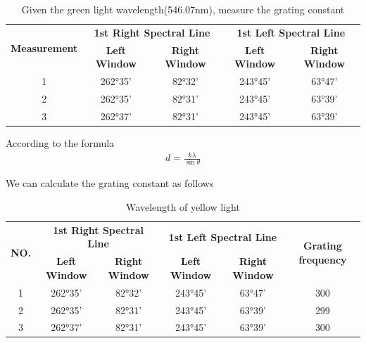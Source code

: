 \documentclass[UTF8]{article}
\begin{document}
   	   	 \begin{table}[htbp]
   	   	 	  \centering
   	   	 	  \caption{Given the green light wavelength(546.07nm), measure the grating constant}
   	   	 	  \begin{tabular}{ccccc}
   	   	 	    \toprule[2pt]
   	   	 	    \multirow{2}{*}{\textbf{Measurement}} & \multicolumn{2}{c}{\textbf{1st Right Spectral Line}} & \multicolumn{2}{c}{\textbf{1st Left Spectral Line}} \\
   	   	 	    \cline{2-5}
   	   	 	    & \textbf{Left Window} & \textbf{Right Window} &  \textbf{Left Window} & \textbf{Right Window}\\
   	   	 	    \midrule
   			    1 & 262°35' & 82°32' & 243°45' & 63°47' \\
   			    2 & 262°35' & 82°31' & 243°45' & 63°39' \\
   			    3 & 262°37' & 82°31' & 243°45' & 63°39' \\
   	   	 	    \bottomrule[2pt]
   	   	 	  \end{tabular}
   	   	 	\end{table}
   	   	 	
   	   	 According to the formula
   	   	 \begin{eqnarray}
   	   	 d = \frac{k\lambda}{\sin \theta}
   	   	 \end{eqnarray}
   	   	 
   	   	 We can calculate the grating constant as follows
   	   	 
  	   	    	 	\begin{table}[htbp]
	   	    	 	  \centering
	   	    	 	  \caption{Wavelength of yellow light}
	   	    	 	  \begin{tabular}{cccccc}
   	    	 	    \toprule[2pt]
   	    	 	    \multirow{2}{*}{\textbf{NO.}} & \multicolumn{2}{c}{\textbf{1st Right Spectral Line}} & \multicolumn{2}{c}{\textbf{1st Left Spectral Line}} &  \multirow{2}{*}{\textbf{Grating frequency}}\\
   	    	 	    \cline{2-5}
   	    	 	    & \textbf{Left Window} & \textbf{Right Window} &  \textbf{Left Window} & \textbf{Right Window}&\\
   	    	 	    \midrule
   			    1 & 262°35' & 82°32' & 243°45' & 63°47' & 300\\
   			    2 & 262°35' & 82°31' & 243°45' & 63°39' & 299\\
   			    3 & 262°37' & 82°31' & 243°45' & 63°39' & 300\\
   	    	 	    \bottomrule[2pt]
	   	    	 	  \end{tabular}
  	   	    	 	\end{table}
  	   	 
\end{document}
